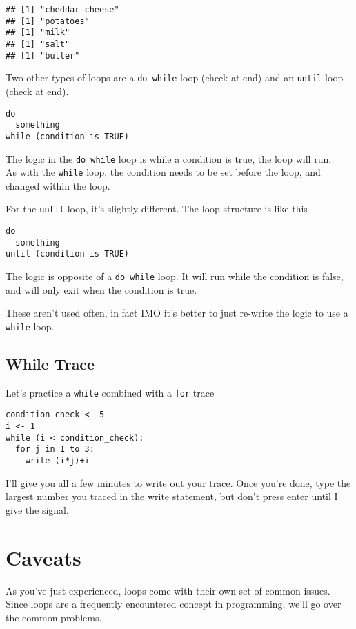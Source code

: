\documentclass[
]{book}
\begin{document}
\begin{verbatim}
## [1] "cheddar cheese"
## [1] "potatoes"
## [1] "milk"
## [1] "salt"
## [1] "butter"
\end{verbatim}

Two other types of loops are a \texttt{do\ while} loop (check at end) and an \texttt{until} loop (check at end).

\begin{verbatim}
do
  something
while (condition is TRUE)
\end{verbatim}

The logic in the \texttt{do\ while} loop is while a condition is true, the loop will run.\\
As with the \texttt{while} loop, the condition needs to be set before the loop, and changed within the loop.

For the \texttt{until} loop, it's slightly different. The loop structure is like this

\begin{verbatim}
do
  something
until (condition is TRUE)
\end{verbatim}

The logic is opposite of a \texttt{do\ while} loop. It will run while the condition is false, and will only exit when the condition is true.

These aren't used often, in fact IMO it's better to just re-write the logic to use a \texttt{while} loop.

\subsection{While Trace}\label{while-trace}

Let's practice a \texttt{while} combined with a \texttt{for} trace

\begin{verbatim}
condition_check <- 5
i <- 1
while (i < condition_check):
  for j in 1 to 3:
    write (i*j)+i
\end{verbatim}

I'll give you all a few minutes to write out your trace. Once you're done,
type the largest number you traced in the write statement, but don't press enter until I give the signal.

\section{Caveats}\label{caveats}

As you've just experienced, loops come with their own set of common issues.\\
Since loops are a frequently encountered concept in programming, we'll go over the common problems.
\end{document}
